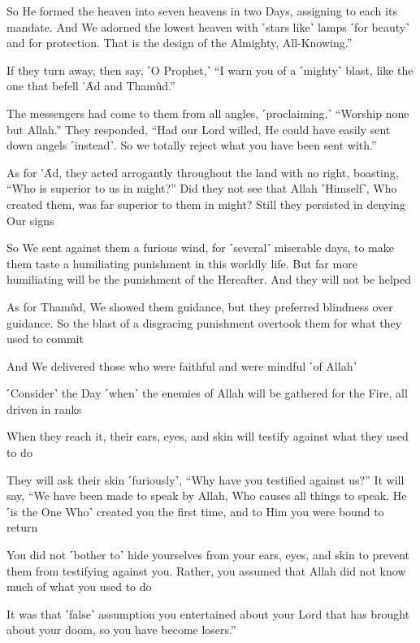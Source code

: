 So He formed the heaven into seven heavens in two Days, assigning to each its mandate. And We adorned the lowest heaven with ˹stars like˺ lamps ˹for beauty˺ and for protection. That is the design of the Almighty, All-Knowing.”

If they turn away, then say, ˹O Prophet,˺ “I warn you of a ˹mighty˺ blast, like the one that befell ’Ȃd and Thamûd.”

The messengers had come to them from all angles, ˹proclaiming,˺ “Worship none but Allah.” They responded, “Had our Lord willed, He could have easily sent down angels ˹instead˺. So we totally reject what you have been sent with.”

As for ’Ȃd, they acted arrogantly throughout the land with no right, boasting, “Who is superior to us in might?” Did they not see that Allah ˹Himself˺, Who created them, was far superior to them in might? Still they persisted in denying Our signs

So We sent against them a furious wind, for ˹several˺ miserable days, to make them taste a humiliating punishment in this worldly life. But far more humiliating will be the punishment of the Hereafter. And they will not be helped

As for Thamûd, We showed them guidance, but they preferred blindness over guidance. So the blast of a disgracing punishment overtook them for what they used to commit

And We delivered those who were faithful and were mindful ˹of Allah˺

˹Consider˺ the Day ˹when˺ the enemies of Allah will be gathered for the Fire, all driven in ranks

When they reach it, their ears, eyes, and skin will testify against what they used to do

They will ask their skin ˹furiously˺, “Why have you testified against us?” It will say, “We have been made to speak by Allah, Who causes all things to speak. He ˹is the One Who˺ created you the first time, and to Him you were bound to return

You did not ˹bother to˺ hide yourselves from your ears, eyes, and skin to prevent them from testifying against you. Rather, you assumed that Allah did not know much of what you used to do

It was that ˹false˺ assumption you entertained about your Lord that has brought about your doom, so you have become losers.”

